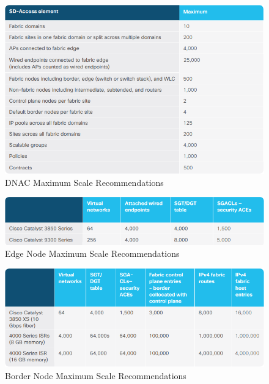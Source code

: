 \begin{figure}[H]
	\centering
	\includegraphics[width=1\linewidth]{img/Analyse/CVD-MaxScale-DNAC-1-2-5}
	\caption{DNAC Maximum Scale Recommendations \cite{sda-designguide-sept2018} }
	\label{fig:DNAC Maximum Scale RecommendationsA}
\end{figure}

\begin{figure}[H]
	\centering
	\includegraphics[width=1\linewidth]{img/Analyse/CVD-MaxScale-EdgeNode-1-2-5}
	\caption{Edge Node Maximum Scale Recommendations \cite{sda-designguide-sept2018} }
	\label{fig:Edge Node Maximum Scale RecommendationsA}
\end{figure}

\begin{figure}[H]
	\centering
	\includegraphics[width=1\linewidth]{img/Analyse/CVD-MaxScale-BorderNode-1-2-5}
	\caption{Border Node Maximum Scale Recommendations \cite{sda-designguide-sept2018} }
	\label{fig:Border Node Maximum Scale RecommendationsA}
\end{figure}



